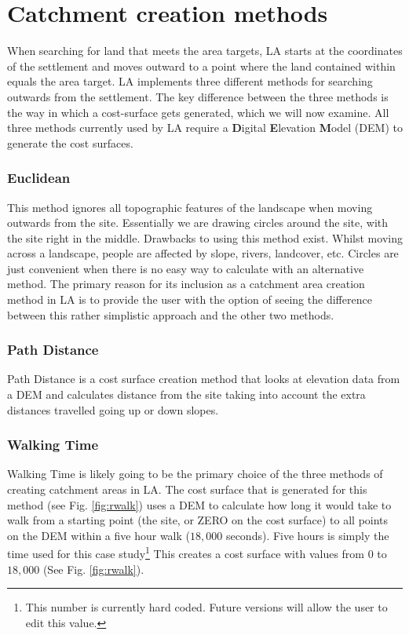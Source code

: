 \section{Catchment creation methods} 

When searching for land that meets the area targets, LA starts at
the coordinates of the settlement and moves outward to a point where the land
contained within equals the area target.  LA implements three
different methods for searching outwards from the settlement.  The key
difference between the three methods is the way in which a cost-surface gets
generated, which we will now examine.  All three methods currently used by LA
require a \textbf{D}igital \textbf{E}levation \textbf{M}odel (DEM) to generate
the cost surfaces.


  \subsubsection{Euclidean} \label{subsection:Euclidean} 
  
  This method ignores all topographic features of the landscape when moving
  outwards from the site.  Essentially we are drawing circles around the site,
  with the site right in the middle.  Drawbacks to using this method exist.
  Whilst moving across a landscape, people are affected by slope, rivers,
  landcover, etc.  Circles are just convenient when there is no easy way to
  calculate with an alternative method.  The primary reason for its inclusion
  as a catchment area creation method in LA is to provide the user
  with the option of seeing the difference between this rather simplistic
  approach and the other two methods.

  \subsubsection{Path Distance}
  
  Path Distance is a cost surface creation method that looks at elevation data
  from a DEM and calculates distance from the site taking into account the
  extra distances travelled going up or down slopes.

  \subsubsection{Walking Time}
  
  Walking Time is likely going to be the primary choice of the three methods of
  creating catchment areas in LA.  The cost surface that is
  generated for this method (see Fig. \ref{fig:rwalk}) uses a DEM to calculate
  how long it would take to walk from a starting point (the site, or ZERO on
  the cost surface) to all points on the DEM within a five hour walk ($18,000$
  seconds). Five hours is simply the time used for this case
  study\footnote{This number is currently hard coded. Future versions will
  allow the user to edit this value.} This creates a cost surface with values
  from $0$ to $18,000$ (See Fig. \ref{fig:rwalk}).  

